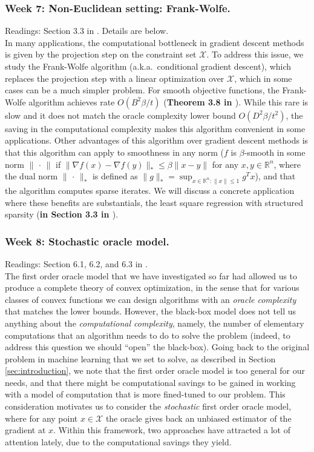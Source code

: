 \subsubsection*{Week 7: Non-Euclidean setting: Frank-Wolfe.}
Readings: Section 3.3 in \cite{bubeck}. Details are below.\\

In many applications, the computational bottleneck in gradient descent methods is given by the projection step on the constraint set $\mathcal{X}$. To address this issue, we study the Frank-Wolfe algorithm (a.k.a.\ conditional gradient descent), which replaces the projection step with a linear optimization over $\mathcal{X}$, which in some cases can be a much simpler problem. For smooth objective functions, the Frank-Wolfe algorithm achieves rate $O(B^2\beta/t)$ (\textbf{Theorem 3.8 in \cite{bubeck}}). While this rare is slow and it does not match the oracle complexity lower bound $O(D^2\beta/t^2)$, the saving in the computational complexity makes this algorithm convenient in some applications. Other advantages of this algorithm over gradient descent methods is that this algorithm can apply to smoothness in any norm ($f$ is $\beta$-smooth in some norm $\|\,\cdot\,\|$ if $\| \nabla f(x) - \nabla f(y) \|_* \le \beta \| x - y \| $ for any $x,y\in\mathbb{R}^n$, where the dual norm $\|\,\cdot\,\|_*$ is defined as $\|g\|_* = \sup_{x\in\mathbb{R}^n:\|x\|\le 1} g^Tx$), and that the algorithm computes sparse iterates. We will discuss a concrete application where these benefits are substantials, the least square regression with structured sparsity (\textbf{in Section 3.3 in \cite{bubeck}}).

\subsubsection*{Week 8: Stochastic oracle model.}
Readings: Section 6.1, 6.2, and 6.3 in \cite{bubeck}.\\

The first order oracle model that we have investigated so far had allowed us to produce a complete theory of convex optimization, in the sense that for various classes of convex functions we can design algorithms with an \emph{oracle complexity} that matches the lower bounds. However, the black-box model does not tell us anything about the \emph{computational complexity}, namely, the number of elementary computations that an algorithm needs to do to solve the problem (indeed, to address this question we should ``open'' the black-box). Going back to the original problem in machine learning that we set to solve, as described in Section \ref{sec:introduction}, we note that the first order oracle model is too general for our needs, and that there might be computational savings to be gained in working with a model of computation that is more fined-tuned to our problem. This consideration motivates us to consider the \emph{stochastic} first order oracle model, where for any point $x\in\mathcal{X}$ the oracle gives back an unbiased estimator of the gradient at $x$. Within this framework, two  approaches have attracted a lot of attention lately, due to the computational savings they yield.


